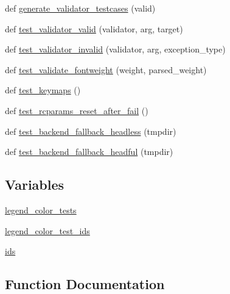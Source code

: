 \begin{DoxyCompactItemize}
\item 
def \hyperlink{namespacematplotlib_1_1tests_1_1test__rcparams_af937cfbf1af23fd3ffe8b1303c03ed9f}{generate\+\_\+validator\+\_\+testcases} (valid)
\item 
def \hyperlink{namespacematplotlib_1_1tests_1_1test__rcparams_a85cdde8af82c9035c31fa8c235031b07}{test\+\_\+validator\+\_\+valid} (validator, arg, target)
\item 
def \hyperlink{namespacematplotlib_1_1tests_1_1test__rcparams_aa12a1a6a04369f20b18ec2a90b779294}{test\+\_\+validator\+\_\+invalid} (validator, arg, exception\+\_\+type)
\item 
def \hyperlink{namespacematplotlib_1_1tests_1_1test__rcparams_a2a1051d673ff99d20af0ddce2e39c4a2}{test\+\_\+validate\+\_\+fontweight} (weight, parsed\+\_\+weight)
\item 
def \hyperlink{namespacematplotlib_1_1tests_1_1test__rcparams_addb24da331b337a5025770d6b8c3f922}{test\+\_\+keymaps} ()
\item 
def \hyperlink{namespacematplotlib_1_1tests_1_1test__rcparams_ae8eaf1141206edf751532d39f9af071b}{test\+\_\+rcparams\+\_\+reset\+\_\+after\+\_\+fail} ()
\item 
def \hyperlink{namespacematplotlib_1_1tests_1_1test__rcparams_a33346a0d4cdbcf90ada27bc1104ac367}{test\+\_\+backend\+\_\+fallback\+\_\+headless} (tmpdir)
\item 
def \hyperlink{namespacematplotlib_1_1tests_1_1test__rcparams_af07a6fcd103ed7b2608df749aae5e352}{test\+\_\+backend\+\_\+fallback\+\_\+headful} (tmpdir)
\end{DoxyCompactItemize}
\subsection*{Variables}
\begin{DoxyCompactItemize}
\item 
\hyperlink{namespacematplotlib_1_1tests_1_1test__rcparams_a38448911c363790344e3904f5e1bcd3e}{legend\+\_\+color\+\_\+tests}
\item 
\hyperlink{namespacematplotlib_1_1tests_1_1test__rcparams_aacd02d40f70370082c73d4f9bd39cf04}{legend\+\_\+color\+\_\+test\+\_\+ids}
\item 
\hyperlink{namespacematplotlib_1_1tests_1_1test__rcparams_a6864035c9a36535b954477d19b2886f8}{ids}
\end{DoxyCompactItemize}


\subsection{Function Documentation}
\mbox{\label{namespacematplotlib_1_1tests_1_1test__rcparams_af937cfbf1af23fd3ffe8b1303c03ed9f}} 
